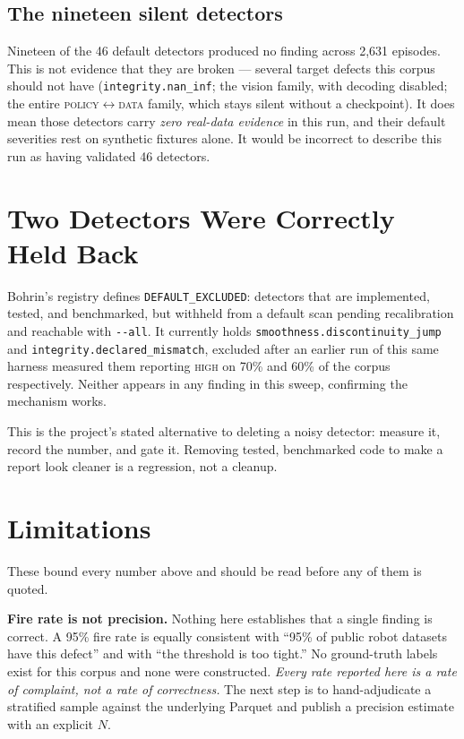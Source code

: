 \documentclass[10pt,a4paper]{article}
\newcommand{\dtr}[1]{\texttt{\small #1}}
\begin{document}
\subsection{The nineteen silent detectors}

Nineteen of the 46 default detectors produced no finding across 2{,}631 episodes. This is
not evidence that they are broken --- several target defects this corpus should not have
(\dtr{integrity.nan\_inf}; the vision family, with decoding disabled; the entire
\textsc{policy}$\leftrightarrow$\textsc{data} family, which stays silent without a
checkpoint). It does mean those detectors carry \emph{zero real-data evidence} in this run,
and their default severities rest on synthetic fixtures alone. It would be incorrect to
describe this run as having validated 46 detectors.

\section{Two Detectors Were Correctly Held Back}
\label{sec:excluded}

Bohrin's registry defines \texttt{DEFAULT\_EXCLUDED}: detectors that are implemented,
tested, and benchmarked, but withheld from a default scan pending recalibration and
reachable with \texttt{-{}-all}. It currently holds \dtr{smoothness.discontinuity\_jump}
and \dtr{integrity.declared\_mismatch}, excluded after an earlier run of this same harness
measured them reporting \textsc{high} on 70\% and 60\% of the corpus respectively. Neither
appears in any finding in this sweep, confirming the mechanism works.

This is the project's stated alternative to deleting a noisy detector: measure it, record
the number, and gate it. Removing tested, benchmarked code to make a report look cleaner
is a regression, not a cleanup.

\section{Limitations}
\label{sec:limits}

These bound every number above and should be read before any of them is quoted.

\textbf{Fire rate is not precision.} Nothing here establishes that a single finding is
correct. A 95\% fire rate is equally consistent with ``95\% of public robot datasets have
this defect'' and with ``the threshold is too tight.'' No ground-truth labels exist for
this corpus and none were constructed. \emph{Every rate reported here is a rate of
complaint, not a rate of correctness.} The next step is to hand-adjudicate a stratified
sample against the underlying Parquet and publish a precision estimate with an explicit
$N$.
\end{document}
